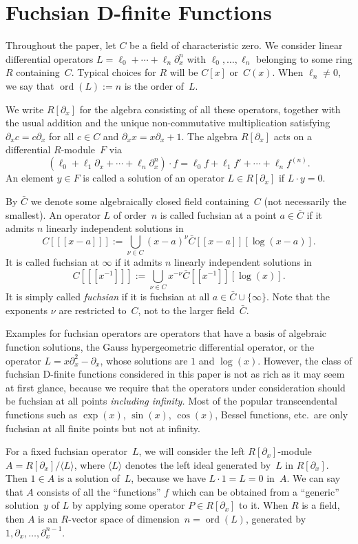 \documentclass[final,1p,times,authoryear]{elsarticle}
\def\ord{\operatorname{ord}}
\def\<#1>{\langle#1\rangle}
\begin{document}
\section{Fuchsian D-finite Functions}

Throughout the paper, let $C$ be a field of characteristic zero. We consider linear differential operators
$L=\ell_0+\cdots+\ell_n\partial_x^n$ with $\ell_0,\dots,\ell_n$ belonging to some ring
$R$ containing~$C$. Typical choices for $R$ will be $C[x]$ or~$C(x)$.
When $\ell_n\neq0$, we say that $\ord(L):=n$ is the order of~$L$.

We write $R[\partial_x]$ for the algebra consisting of all these operators, together
with the usual addition and the unique non-commutative multiplication satisfying
$\partial_xc=c\partial_x$ for all $c\in C$ and $\partial_xx=x\partial_x+1$.
The algebra $R[\partial_x]$ acts on a differential $R$-module~$F$ via
\[
  (\ell_0+\ell_1\partial_x+\cdots+\ell_n\partial_x^n)\cdot f=
   \ell_0f + \ell_1f' + \cdots + \ell_n f^{(n)}.
\]
An element $y\in F$ is called a solution of an operator $L\in R[\partial_x]$ if
$L\cdot y=0$.

By $\bar C$ we denote some algebraically closed field containing~$C$ (not necessarily the smallest).
An operator $L$ of order~$n$ is called fuchsian at a point $a\in\bar C$ if
it admits $n$ linearly independent solutions in
\[
  C[[[x-a]]] := \bigcup_{\nu\in C} (x-a)^\nu\bar C[[x-a]][\log(x-a)].
\]
It is called fuchsian at $\infty$ if it admits $n$ linearly independent solutions in
\[
  C[[[x^{-1}]]] := \bigcup_{\nu\in C} x^{-\nu} \bar C[[x^{-1}]][\log(x)].
\]
It is simply called \emph{fuchsian} if it is fuchsian at all $a\in\bar C\cup\{\infty\}$.
Note that the exponents $\nu$ are restricted to~$C$, not to the larger field~$\bar C$.

Examples for fuchsian operators are operators that have a basis of algebraic
function solutions, the Gauss hypergeometric differential operator, or the
operator $L=x\partial_x^2-\partial_x$, whose solutions are $1$ and $\log(x)$.
However, the class of fuchsian D-finite functions
considered in this paper is not as rich as it may seem at first glance, because
we require that the operators under consideration should be fuchsian at all
points \emph{including infinity.} Most of the popular transcendental functions
such as $\exp(x)$, $\sin(x)$, $\cos(x)$, Bessel functions, etc.\ are only
fuchsian at all finite points but not at infinity.

For a fixed fuchsian operator~$L$, we will consider the left $R[\partial_x]$-module
$A=R[\partial_x]/\<L>$, where $\<L>$ denotes the left ideal generated by~$L$ in
$R[\partial_x]$.  Then $1\in A$ is a solution of~$L$, because we have $L\cdot 1=L=0$
in~$A$. We can say that $A$ consists of all the ``functions'' $f$ which can be
obtained from a ``generic'' solution~$y$ of $L$ by applying some operator $P\in
R[\partial_x]$ to it. When $R$ is a field, then $A$ is an $R$-vector space of
dimension~$n=\ord(L)$, generated by $1,\partial_x,\dots,\partial_x^{n-1}$.
\end{document}
